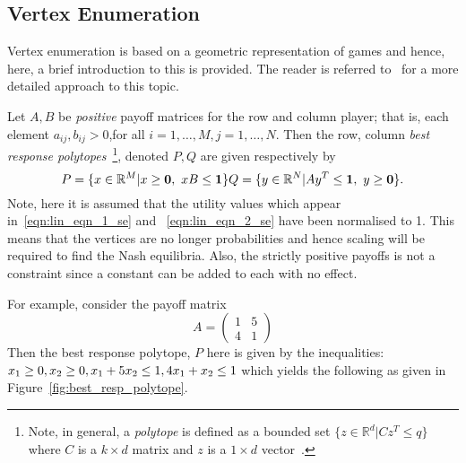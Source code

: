 \subsection{Vertex Enumeration}\label{subsec:Vertex_Enumeration}
Vertex enumeration is based on a geometric representation of games and hence,
here, a brief introduction to this is provided. The reader is referred
to~\cite{NoamNisan2007} for a more detailed approach to this topic.


\begin{definition}
    Let \(A, B\) be \emph{positive} payoff matrices for the row and column
    player; that is, each element \(a_{ij}, b_{ij} > 0\),for all \(i = 1,
    \ldots, M, j = 1, \ldots, N\). Then the row, column
    \textit{best response polytopes}~\footnote{Note, in general, a
    \emph{polytope} is defined as a bounded set \(\{z \in \mathbb{R}^{d} |
    Cz^{T} \le q\}\) where \(C\) is a \(k \times d\) matrix and \(z\) is a \(1
    \times d\) vector~\cite{NoamNisan2007}.}, denoted \(P, Q\) are given respectively by
    \begin{equation}
        P = \{x \in \mathbb{R}^{M} | x \ge \textbf{0}, ~ xB \le \textbf{1}\} \\
        Q = \{y \in \mathbb{R}^{N} | Ay^{T} \le \textbf{1}, ~ y \ge \textbf{0}\}.
    \end{equation}
    Note, here it is assumed that the utility values which appear
    in~\ref{eqn:lin_eqn_1_se} and ~\ref{eqn:lin_eqn_2_se} have been normalised
    to 1. This means that the vertices are no longer probabilities and hence
    scaling will be required to find the Nash equilibria. Also, the strictly
    positive payoffs is not a constraint since a constant can be added to each
    with no effect. 
\end{definition}\label{def:best_resp_polytopes}


For example, consider the payoff matrix 
\begin{equation}
    A = \begin{pmatrix}
        1 & 5 \\
        4 & 1
    \end{pmatrix}
\end{equation}\label{eqn:ex_vert_en}
Then the best response polytope, \(P\) here is given by the inequalities:
\(
    x_{1} \ge 0, \\
    x_{2} \ge 0, \\
    x_{1} + 5x_{2} \le 1, \\
    4x_{1} + x_{2} \le 1 \\
\)
which yields the following as given in Figure~\ref{fig:best_resp_polytope}.

